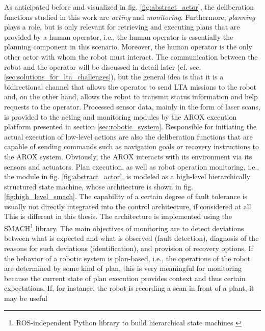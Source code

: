 \documentclass[english, master, utf8]{base/thesis_KBS}
\newcommand{\code}{\collectverb{\codebox}}
\begin{document}
\noindent
As anticipated before and visualized in fig. \ref{fig:abstract_actor}, the deliberation functions studied in this work are \textit{acting} and \textit{monitoring}. Furthermore, \textit{planning} plays a role,
but is only relevant for retrieving and executing plans that are provided by a human operator, i.e., the human operator is essentially the planning component in this scenario.
Moreover, the human operator is the only other actor with whom the robot must interact. The communication between the robot and the operator will be discussed in detail later (cf. sec.
\ref{sec:solutions_for_lta_challenges}), but the general idea is that it is a bidirectional channel that allows the operator to send LTA missions to the robot and, on the
other hand, allows the robot to transmit status information and help requests to the operator. Processed sensor data, mainly in the form of laser scans, is provided to the
acting and monitoring modules by the AROX execution platform presented in section \ref{sec:robotic_system}. Responsible for initiating the actual execution of low-level actions
are also the deliberation functions that are capable of sending commands such as \code{move_base_flex} navigation goals or recovery instructions to the AROX system.
Obviously, the AROX interacts with its environment via its sensors and actuators.\newline
Plan execution, as well as robot operation monitoring, i.e., the  module in fig. \ref{fig:abstract_actor}, is modeled as a high-level hierarchically
structured state machine, whose architecture is shown in fig. \ref{fig:high_level_smach}. The capability of a certain degree of fault tolerance is usually not directly integrated
into the control architecture, if considered at all. \cite{Khalastchi:2018} This is different in this thesis.
The architecture is implemented using the SMACH\footnote{ROS-independent Python
library to build hierarchical state machines \cite{smach}} library. The main objectives of monitoring are to detect deviations between what is expected and what is observed
(fault detection), diagnosis of the reasons for such deviations (identification), and provision of recovery options. \cite{Ingrand:2017}
If the behavior of a robotic system is plan-based, i.e., the operations of the robot are determined by some kind of plan, this is very meaningful for monitoring because the current
state of plan execution provides context and thus certain expectations. \cite{Khalastchi:2018} If, for instance, the robot is recording a scan in front of a plant, it may be useful
\end{document}
